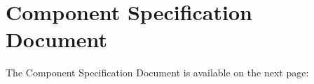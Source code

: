 \documentclass[11pt, oneside, a4paper]{report}   %
\begin{document}
\section{Component Specification Document}
The Component Specification Document is available on the next page: \\
\pagebreak

\pagebreak


\end{document}
